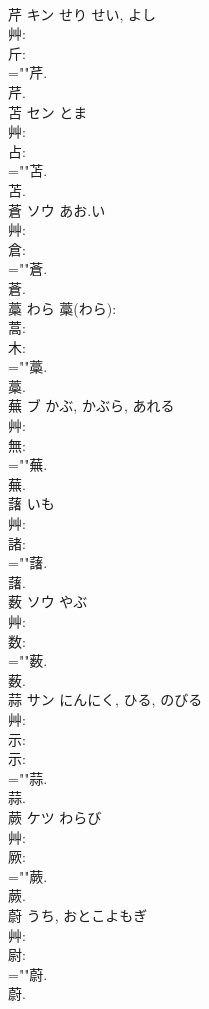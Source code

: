 \documentclass[8pt]{extreport}
\begin{document}
\begin{CJK}{UTF8}{min}
\\	芹	キン	せり	せい, よし	
\\	艸: 
\\	斤: 
\\	=""芹.
\\	芹.
\\	苫	セン	とま		
\\	艸: 
\\	占: 
\\	=""苫.
\\	苫.
\\	蒼	ソウ	あお.い		
\\	艸: 
\\	倉: 
\\	=""蒼.
\\	蒼.
\\	藁		わら			藁(わら): 
\\	蒿: 
\\	木: 
\\	=""藁.
\\	藁.
\\	蕪	ブ	かぶ, かぶら, あれる		
\\	艸: 
\\	無: 
\\	=""蕪.
\\	蕪.
\\	藷		いも				
\\	艸: 
\\	諸: 
\\	=""藷.
\\	藷.
\\	薮	ソウ	やぶ		
\\	艸: 
\\	数: 
\\	=""薮.
\\	薮.
\\	蒜	サン	にんにく, ひる, のびる		
\\	艸: 
\\	示: 
\\	示: 
\\	=""蒜.
\\	蒜.
\\	蕨	ケツ	わらび		
\\	艸: 
\\	厥: 
\\	=""蕨.
\\	蕨.
\\	蔚		うち, おとこよもぎ				
\\	艸: 
\\	尉: 
\\	=""蔚.
\\	蔚.

\end{CJK}
\end{document}
